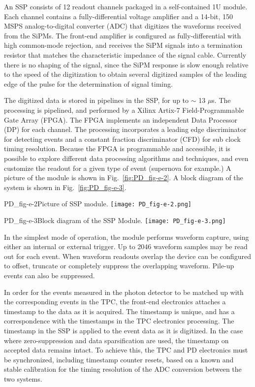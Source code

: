 An SSP consists of 12 readout channels packaged in a self-contained 
1U module.  
Each channel contains a fully-differential voltage amplifier and a 
14-bit, 150 MSPS analog-to-digital converter (ADC) that 
digitizes the waveforms received from the SiPMs.  
The front-end amplifier is configured as fully-differential with high common-mode 
rejection, and receives the SiPM signals into a termination resistor that 
matches the characteristic impedance of the signal cable. 
Currently there is no shaping of the signal, since the SiPM response 
is slow enough relative to the speed of the digitization to obtain 
several digitized samples of the leading edge of the pulse for the determination of signal timing.  

The digitized data is stored in pipelines in the SSP, for up to $\sim$ 13 $\mu$s.  
The processing is pipelined, and performed by a Xilinx Artix-7 
Field-Programmable Gate Array (FPGA).  
The FPGA implements an independent Data Processor (DP) for each channel.  
The processing incorporates a leading edge discriminator for detecting events
and a constant fraction discriminator (CFD) for sub 
clock timing resolution.  
Because the FPGA is programmable and accessible, it is possible to explore 
different data processing algorithms and techniques, and even customize the 
readout for a given type of event (supernova for example.)  
A picture of the module is shown in Fig.~\ref{fig:PD_fig-e-2}.  
A block diagram of the system is shown in Fig.~\ref{fig:PD_fig-e-3}.
%
\begin{cdrfigure}{PD_fig-e-2}{Picture of SSP module.}
  \texttt{[image: PD\_fig-e-2.png]}
\end{cdrfigure}

\begin{cdrfigure}{PD_fig-e-3}{Block diagram of the SSP Module.}
  \texttt{[image: PD\_fig-e-3.png]}
\end{cdrfigure}
%
In the simplest mode of operation, the module performs waveform capture, 
using either an internal  or  external trigger.  
Up to 2046 waveform samples may be read out for each event.  When waveform 
readouts overlap the device can be configured to offset, 
truncate or completely suppress the overlapping waveform.  
Pile-up events can also be suppressed.  


In order for the events measured in the photon detector to be matched up 
with the corresponding events in the TPC, the front-end electronics 
attaches a timestamp to the data as it is acquired.  
The timestamp is unique, and has a correspondence with the timestamps in 
the TPC electronics processing.  
The timestamp in the SSP is applied to the event data as it is digitized. 
In the case where zero-suppression and data sparsification are used, 
the timestamp on accepted data remains intact.  
To achieve this, the TPC and PD electronics must be synchronized, 
including timestamp counter resets, based on a known and stable calibration for the timing resolution of the ADC conversion between the two systems.  

